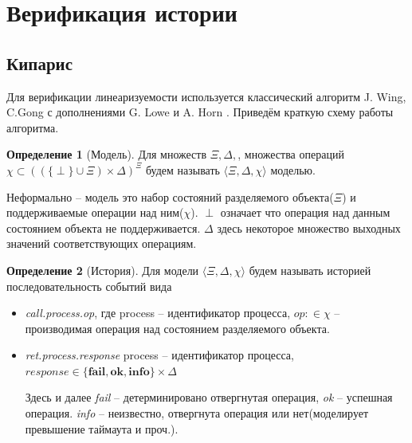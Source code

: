 \documentclass[pdftex,ptm,14pt,a4paper]{extreport}
\title{}
\author{М.С. Сурин}
\theoremstyle{definition}
\newtheorem{definition}{Определение}[chapter]
\begin{document}
\section{Верификация истории}
\subsection{Кипарис}
\label{cypress-verify}
Для верификации линеаризуемости используется классический алгоритм J. Wing, C.Gong \cite{wing-testing}
с дополнениями G. Lowe \cite{lowe-testing} и A. Horn \cite{horn-faster}.
Приведём краткую схему работы алгоритма.
\begin{definition}[Модель]
    Для множеств $\Xi, \Delta,$, множества операций $\chi \subset ((\{\perp \} \cup \Xi) \times \Delta)^\Xi$
    будем называть $\langle \Xi, \Delta, \chi \rangle$ моделью.
\end{definition}

Неформально -- модель это набор состояний разделяемого объекта($\Xi$) и поддерживаемые операции над ним($\chi$).
$\perp$ означает что операция над данным состоянием объекта не поддерживается. $\Delta$ здесь некоторое множество
выходных значений соответствующих операциям.

\begin{definition}[История]
    Для модели $\langle \Xi, \Delta, \chi \rangle$ будем называть историей последовательность событий вида
    \begin{itemize}
        \item \textit{call.process.op}, где process --  идентификатор процесса,
             $\textit{op}: \in \chi$  -- производимая операция над состоянием разделяемого объекта.
        \item \textit{ret.process.response} process -- идентификатор процесса,
            $\textit{response} \in  \{\textbf{fail},\textbf{ok},\textbf{info}\} \times \Delta$

            Здесь и далее
        \subitem \textit{fail} -- детерминировано отвергнутая операция,
        \subitem \textit{ok} -- успешная операция.
        \subitem \textit{info} -- неизвестно, отвергнута операция или нет(моделирует превышение таймаута и проч.).
    \end{itemize}
\end{definition}
\end{document}
